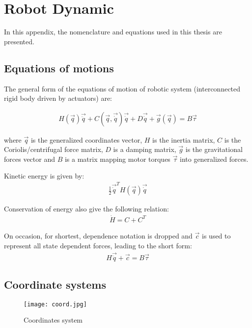 \chapter{Robot Dynamic}
\label{sec:robotdynamic}

In this appendix, the nomenclature and equations used in this thesis are presented.

\section{Equations of motions}
\label{sec:eom}

The general form of the equations of motion of robotic system (interconnected rigid body driven by actuators) are:

\begin{align}
H(\vec{q}) \vec{\ddot{q}} + C(\vec{q},\vec{\dot{q}}) \vec{\dot{q}} + D \vec{\dot{q}} + \vec{g}(\vec{q}) = B \vec{\tau} 
\label{eq:manipulator}
\end{align}

where $\vec{q}$ is the generalized coordinates vector, $H$ is the inertia matrix, $C$ is the Coriolis/centrifugal force matrix, $D$ is a damping matrix, $\vec{g}$ is the gravitational forces vector and $B$ is a matrix mapping motor torques $\vec{\tau}$ into generalized forces.

Kinetic energy is given by:
\begin{align}
\frac{1}{2} \vec{\dot{q}}^T H(\vec{q}) \vec{\dot{q}} 
\label{eq:kinetic}
\end{align}

Conservation of energy also give the following relation:
\begin{align}
\dot{H} = C + C^T
\label{eq:kinetic}
\end{align}

On occasion, for shortest, dependence notation is dropped and $\vec{c}$ is used to represent all state dependent forces, leading to the short form:
\begin{align}
H \vec{\ddot{q}} + \vec{c} = B \vec{\tau} 
\label{eq:manipulator_short}
\end{align}

\section{Coordinate systems}
\label{sec:coord}


\begin{figure}[H]
	\centering
		\texttt{[image: coord.jpg]}
	\caption{Coordinates system}
	\label{fig:coord}
\end{figure}

